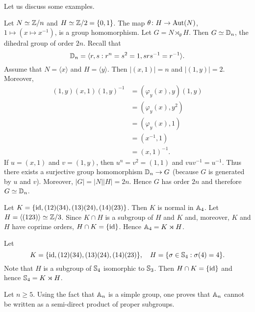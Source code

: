 
Let us discuss some examples. 

\begin{example}
Let $N\simeq \mathbb{Z}/n$ and $H\simeq\mathbb{Z}/2=\{0,1\}$. The map $\theta\colon H\to\operatorname{Aut}(N)$, 
$1\mapsto (x\mapsto x^{-1})$, is a group homomorphism. Let $G=N\rtimes_\theta H$.
Then $G\simeq\mathbb{D}_n$, the dihedral group of order $2n$.
Recall that 
\[
\mathbb{D}_n=\langle r,s:r^n=s^2=1, srs^{-1}=r^{-1}\rangle.
\]
Assume that $N=\langle x\rangle$ and $H=\langle y\rangle$. Then $|(x,1)|=n$ and $|(1,y)|=2$. 
Moreover,
\begin{align*}
(1,y)(x,1)(1,y)^{-1} &= (\varphi_y(x),y)(1,y)\\
&=(\varphi_y(x),y^2)\\
&=(\varphi_y(x),1)\\
&=(x^{-1},1)\\
&=(x,1)^{-1}.
\end{align*}
If $u=(x,1)$ and $v=(1,y)$, then $u^n=v^2=(1,1)$ and $vuv^{-1}=u^{-1}$. Thus there exists 
a surjective group homomorphism 
$\mathbb{D}_n\to G$ (because $G$ is generated by $u$ and $v$). Moreover, $|G|=|N||H|=2n$. Hence 
$G$ has order $2n$ and therefore $G\simeq\mathbb{D}_n$.
\end{example}

\begin{example}
Let $K=\{\operatorname{id},(12)(34),(13)(24),(14)(23)\}$. Then $K$ is normal in $\mathbb{A}_4$. 
Let $H=\langle (123)\rangle\simeq\mathbb{Z}/3$. Since $K\cap H$ is a subgroup of $H$ and $K$ and, moreover, 
$K$ and $H$ have coprime orders, $H\cap K=\{\operatorname{id}\}$. Hence $\mathbb{A}_4=K\rtimes H$.
\end{example}

\begin{example}
Let 
\[
K=\{\operatorname{id},(12)(34),(13)(24),(14)(23)\},\quad  
H=\{\sigma\in\mathbb{S}_4:\sigma(4)=4\}.
\]
Note that $H$ is a subgroup of 
$\mathbb{S}_4$ isomorphic to $\mathbb{S}_3$. Then $H\cap K=\{\operatorname{id}\}$ and hence 
$\mathbb{S}_4=K\rtimes H$.
\end{example}

Let $n\geq5$. 
Using the fact that $\mathbb{A}_n$ is a simple group,  
one proves that $\mathbb{A}_n$ cannot be written as a semi-direct product of proper subgroups. 

